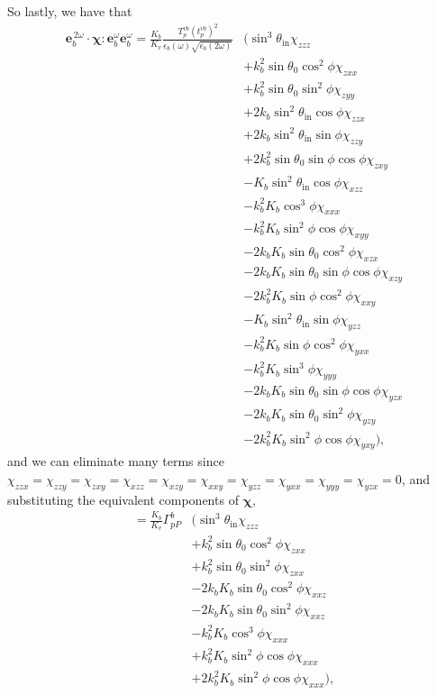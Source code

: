 So lastly, we have that
\begin{equation*}
\begin{split}
\mathbf{e}^{\,2\omega}_{b}\cdot
\boldsymbol{\chi}:\mathbf{e}^{\omega}_{b}\mathbf{e}^{\omega}_{b} =
\frac{K_{b}}{K_{v}}
\frac{T_{p}^{vb}\left(t^{vb}_{p}\right)^{2}}
     {\epsilon_{b}(\omega)\sqrt{\epsilon_{b}(2\omega)}}
&\big(
   \sin^{3}\theta_{\mathrm{in}}\chi_{zzz}\\
&+ k^{2}_{b}\sin\theta_{0}\cos^{2}\phi\chi_{zxx}\\
&+ k^{2}_{b}\sin\theta_{0}\sin^{2}\phi\chi_{zyy}\\
&+ 2k_{b}\sin^{2}\theta_{\mathrm{in}}\cos\phi\chi_{zzx}\\
&+ 2k_{b}\sin^{2}\theta_{\mathrm{in}}\sin\phi\chi_{zzy}\\
&+ 2k^{2}_{b}\sin\theta_{0}\sin\phi\cos\phi\chi_{zxy}\\
&- K_{b}\sin^{2}\theta_{\mathrm{in}}\cos\phi\chi_{xzz}\\
&- k^{2}_{b}K_{b}\cos^{3}\phi\chi_{xxx}\\
&- k^{2}_{b}K_{b}\sin^{2}\phi\cos\phi\chi_{xyy}\\
&- 2k_{b}K_{b}\sin\theta_{0}\cos^{2}\phi\chi_{xzx}\\
&- 2k_{b}K_{b}\sin\theta_{0}\sin\phi\cos\phi\chi_{xzy}\\
&- 2k^{2}_{b}K_{b}\sin\phi\cos^{2}\phi\chi_{xxy}\\
&- K_{b}\sin^{2}\theta_{\mathrm{in}}\sin\phi\chi_{yzz}\\
&- k^{2}_{b}K_{b}\sin\phi\cos^{2}\phi\chi_{yxx}\\
&- k^{2}_{b}K_{b}\sin^{3}\phi\chi_{yyy}\\
&- 2k_{b}K_{b}\sin\theta_{0}\sin\phi\cos\phi\chi_{yzx}\\
&- 2k_{b}K_{b}\sin\theta_{0}\sin^{2}\phi\chi_{yzy}\\
&- 2k^{2}_{b}K_{b}\sin^{2}\phi\cos\phi\chi_{yxy}
\big),
\end{split}
\end{equation*}
and we can eliminate many terms since
$\chi_{zzx}=\chi_{zzy}=\chi_{zxy}=\chi_{xzz}=\chi_{xzy}=\chi_{xxy}=\chi_{yzz}
=\chi_{yxx}=\chi_{yyy}=\chi_{yzx}=0$, and substituting the equivalent
components of $\boldsymbol{\chi},$
\begin{equation*}
\begin{split}
=
\frac{K_{b}}{K_{v}}
\Gamma^{b}_{pP}
&\big(
   \sin^{3}\theta_{\mathrm{in}}\chi_{zzz}\\
&+ k^{2}_{b}\sin\theta_{0}\cos^{2}\phi\chi_{zxx}\\
&+ k^{2}_{b}\sin\theta_{0}\sin^{2}\phi\chi_{zxx}\\
&- 2k_{b}K_{b}\sin\theta_{0}\cos^{2}\phi\chi_{xxz}\\
&- 2k_{b}K_{b}\sin\theta_{0}\sin^{2}\phi\chi_{xxz}\\
&- k^{2}_{b}K_{b}\cos^{3}\phi\chi_{xxx}\\
&+ k^{2}_{b}K_{b}\sin^{2}\phi\cos\phi\chi_{xxx}\\
&+ 2k^{2}_{b}K_{b}\sin^{2}\phi\cos\phi\chi_{xxx}
\big),
\end{split}
\end{equation*}
